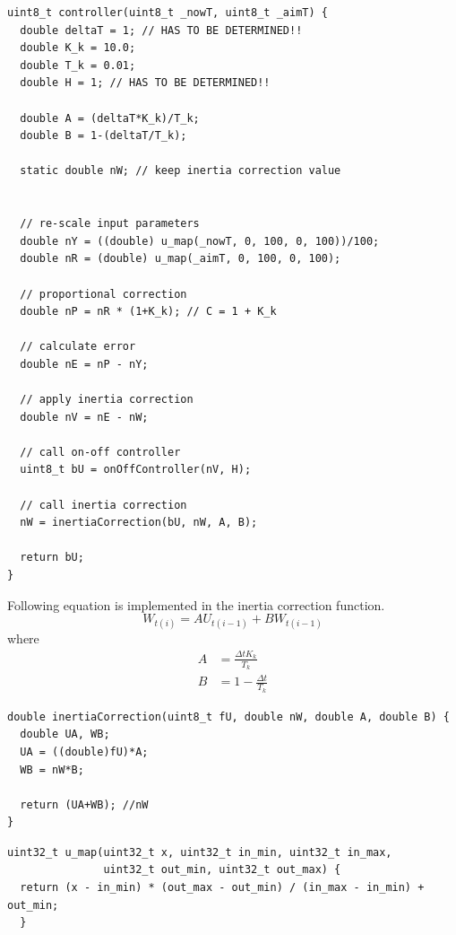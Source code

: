 \begin{verbatim}
uint8_t controller(uint8_t _nowT, uint8_t _aimT) {
  double deltaT = 1; // HAS TO BE DETERMINED!!
  double K_k = 10.0;
  double T_k = 0.01;
  double H = 1; // HAS TO BE DETERMINED!!

  double A = (deltaT*K_k)/T_k;
  double B = 1-(deltaT/T_k);

  static double nW; // keep inertia correction value


  // re-scale input parameters
  double nY = ((double) u_map(_nowT, 0, 100, 0, 100))/100;
  double nR = (double) u_map(_aimT, 0, 100, 0, 100);

  // proportional correction
  double nP = nR * (1+K_k); // C = 1 + K_k

  // calculate error
  double nE = nP - nY;

  // apply inertia correction
  double nV = nE - nW;

  // call on-off controller
  uint8_t bU = onOffController(nV, H);

  // call inertia correction
  nW = inertiaCorrection(bU, nW, A, B);

  return bU;
}
\end{verbatim}

Following equation is implemented in the inertia correction function.
\begin{equation}
W_{t(i)} = AU_{t(i-1)}+BW_{t(i-1)}
\end{equation}
where
\begin{align}
A&=\frac{\Delta t K_k}{T_k} \\
B&=1-\frac{\Delta t}{T_k}
\end{align}

\begin{verbatim}
double inertiaCorrection(uint8_t fU, double nW, double A, double B) {
  double UA, WB;
  UA = ((double)fU)*A;
  WB = nW*B;

  return (UA+WB); //nW
}
\end{verbatim}

\begin{verbatim}
uint32_t u_map(uint32_t x, uint32_t in_min, uint32_t in_max, 
			   uint32_t out_min, uint32_t out_max) {
  return (x - in_min) * (out_max - out_min) / (in_max - in_min) + out_min; 
  }
\end{verbatim}

